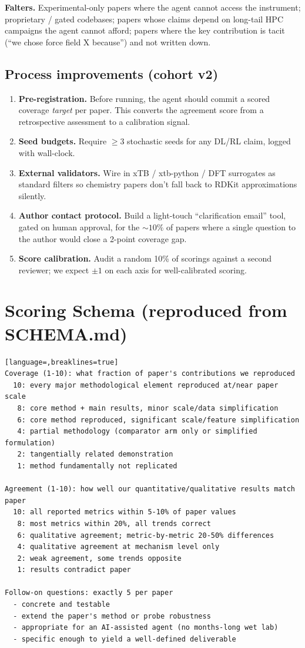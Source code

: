 \documentclass[11pt]{article}
\begin{document}
\textbf{Falters.} Experimental-only papers where the agent cannot access the
instrument; proprietary / gated codebases; papers whose claims depend on
long-tail HPC campaigns the agent cannot afford; papers where the key
contribution is tacit (``we chose force field X because'') and not written down.

\subsection{Process improvements (cohort v2)}
\begin{enumerate}
\item \textbf{Pre-registration.} Before running, the agent should commit a
scored coverage \emph{target} per paper. This converts the agreement score
from a retrospective assessment to a calibration signal.
\item \textbf{Seed budgets.} Require $\geq 3$ stochastic seeds for any DL/RL
claim, logged with wall-clock.
\item \textbf{External validators.} Wire in xTB / xtb-python / DFT surrogates
as standard filters so chemistry papers don't fall back to RDKit
approximations silently.
\item \textbf{Author contact protocol.} Build a light-touch
``clarification email'' tool, gated on human approval, for the $\sim 10\%$ of
papers where a single question to the author would close a 2-point coverage
gap.
\item \textbf{Score calibration.} Audit a random 10\% of scorings against a
second reviewer; we expect $\pm 1$ on each axis for well-calibrated scoring.
\end{enumerate}


\clearpage
\appendix
\section{Scoring Schema (reproduced from SCHEMA.md)}
\begin{lstlisting}[language=,breaklines=true]
Coverage (1-10): what fraction of paper's contributions we reproduced
  10: every major methodological element reproduced at/near paper scale
   8: core method + main results, minor scale/data simplification
   6: core method reproduced, significant scale/feature simplification
   4: partial methodology (comparator arm only or simplified formulation)
   2: tangentially related demonstration
   1: method fundamentally not replicated

Agreement (1-10): how well our quantitative/qualitative results match paper
  10: all reported metrics within 5-10% of paper values
   8: most metrics within 20%, all trends correct
   6: qualitative agreement; metric-by-metric 20-50% differences
   4: qualitative agreement at mechanism level only
   2: weak agreement, some trends opposite
   1: results contradict paper

Follow-on questions: exactly 5 per paper
  - concrete and testable
  - extend the paper's method or probe robustness
  - appropriate for an AI-assisted agent (no months-long wet lab)
  - specific enough to yield a well-defined deliverable
\end{lstlisting}
\end{document}
